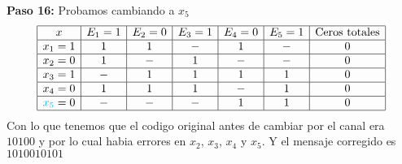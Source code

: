 \begin{sol}
\textbf{Paso 16:} Probamos cambiando a $x_5$
\[
\begin{array}{|c|c|c|c|c|c|c|c|}
\hline
x & E_1=1 & E_2=0 & E_3=1 & E_4=0 & E_5=1 & \text{Ceros totales}\\
\hline
x_1= 1& 1 & 1 & - & 1 & - & 0\\
\hline
x_2=0& 1&-& 1& - &-&0\\
\hline
x_3=1& -& 1& 1 & 1 & 1 &0\\
\hline
x_4=0& 1&1&1&-&1&0\\
\hline
\textcolor{cyan}{x_5}=0&-&-&-&1&1&0\\
\hline
\end{array}
\]
Con lo que tenemos que el codigo original antes de cambiar por el canal era $10100$ y por lo cual habia errores en $x_2$, $x_3$, $x_4$ y $x_5$. Y el mensaje corregido es $1010010101$












\end{sol}